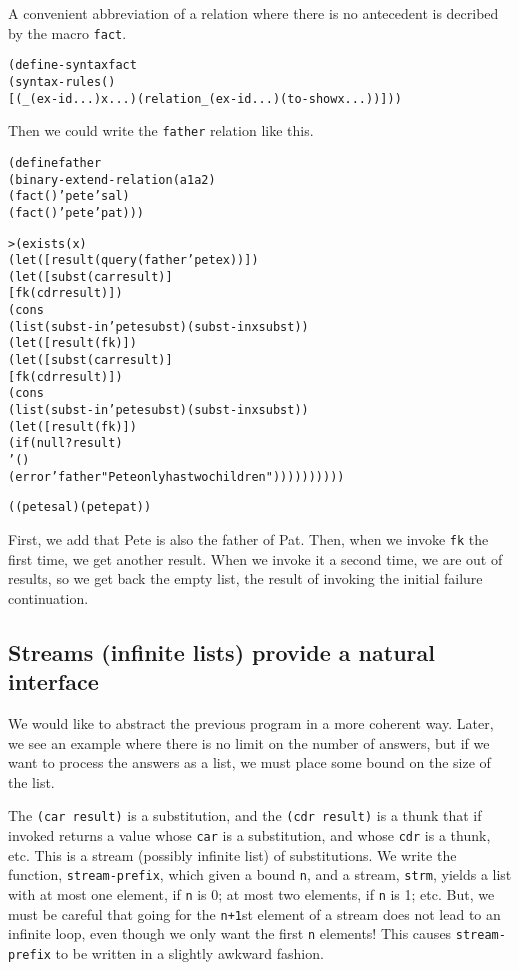 A convenient abbreviation of a relation where there is no antecedent
is decribed by the macro \texttt{fact}.

\begin{alltt}
(define-syntax fact
  (syntax-rules ()
    [(_ (ex-id ...) x ...) (relation _ (ex-id ...) (to-show x ...))]))
\end{alltt}

Then we could write the \texttt{father} relation like this.

\begin{alltt}
(define father
  (binary-extend-relation (a1 a2)
    (fact () 'pete 'sal)
    (fact () 'pete 'pat)))
\end{alltt}

\begin{alltt}
> (exists (x)
    (let ([result (query (father 'pete x))])
      (let ([subst (car result)]
            [fk (cdr result)])
      (cons
        (list (subst-in 'pete subst) (subst-in x subst))
        (let ([result (fk)])
          (let ([subst (car result)]
                [fk (cdr result)])
            (cons
              (list (subst-in 'pete subst) (subst-in x subst))
              (let ([result (fk)])
                (if (null? result)
                  '()
                  (error 'father "Pete only has two children"))))))))))

((pete sal) (pete pat))
\end{alltt}
\noindent
First, we add that Pete is also the father of Pat.  Then, when we
invoke \texttt{fk} the first time, we get another result.  When we
invoke it a second time, we are out of results, so we get back the
empty list, the result of invoking the initial failure continuation.

\subsection{Streams (infinite lists) provide a natural interface}

We would like to abstract the previous program in a more coherent way.
Later, we see an example where there is no limit on the number of
answers, but if we want to process the answers as a list, we must
place some bound on the size of the list.

The \texttt{(car result)} is a substitution, and the \texttt{(cdr
result)} is a thunk that if invoked returns a value whose \texttt{car}
is a substitution, and whose \texttt{cdr} is a thunk, etc.  This is a
stream (possibly infinite list) of substitutions.  We write the
function, \texttt{stream-prefix}, which given a bound \texttt{n}, and
a stream, \texttt{strm}, yields a list with at most one element, if
\texttt{n} is 0; at most two elements, if \texttt{n} is 1; etc.  But,
we must be careful that going for the \texttt{n+1}st element of a
stream does not lead to an infinite loop, even though we only want the
first \texttt{n} elements! This causes \texttt{stream-prefix} to be
written in a slightly awkward fashion.

